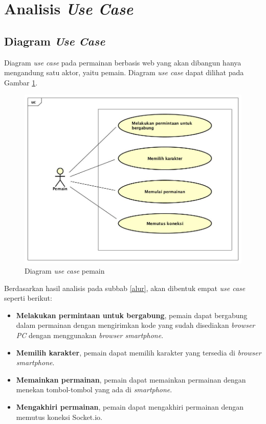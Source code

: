 \section{Analisis \textit{Use Case}}
\label{sec:usecase}

\subsection{Diagram \textit{Use Case}}
\label{subsec:diagram_usecase}

Diagram \textit{use case} pada permainan berbasis web yang akan dibangun hanya mengandung satu aktor, yaitu pemain. Diagram \textit{use case} dapat dilihat pada Gambar \ref{fig:usecase_pemain}.

\begin{figure}[H]
	\centering
	\includegraphics[scale=0.4]{Gambar/usecase_pemain}
	\caption{Diagram \textit{use case} pemain}
	\label{fig:usecase_pemain}
\end{figure}

Berdasarkan hasil analisis pada subbab \ref{alur}, akan dibentuk empat \textit{use case} seperti berikut:

\begin{itemize}
	\item \textbf{Melakukan permintaan untuk bergabung}, pemain dapat bergabung dalam permainan dengan mengirimkan kode yang sudah disediakan \textit{browser PC} dengan menggunakan \textit{browser smartphone}.
	
	\item \textbf{Memilih karakter}, pemain dapat memilih karakter yang tersedia di \textit{browser smartphone}.
	
	\item \textbf{Memainkan permainan}, pemain dapat memainkan permainan dengan menekan tombol-tombol yang ada di \textit{smartphone}.
	
	\item \textbf{Mengakhiri permainan}, pemain dapat mengakhiri permainan dengan memutus koneksi Socket.io.
\end{itemize}

